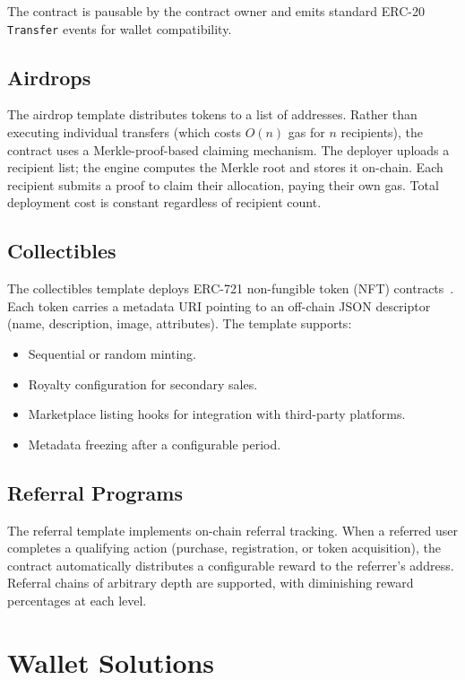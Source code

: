 \documentclass[11pt,letterpaper]{article}
\begin{document}
The contract is pausable by the contract owner and emits standard ERC-20
\texttt{Transfer} events for wallet compatibility.

\subsection{Airdrops}

The airdrop template distributes tokens to a list of addresses.  Rather than
executing individual transfers (which costs $O(n)$ gas for $n$ recipients),
the contract uses a Merkle-proof-based claiming mechanism.  The deployer
uploads a recipient list; the engine computes the Merkle root and stores it
on-chain.  Each recipient submits a proof to claim their allocation, paying
their own gas.  Total deployment cost is constant regardless of recipient
count.

\subsection{Collectibles}

The collectibles template deploys ERC-721 non-fungible token (NFT)
contracts~\cite{entriken2018}.  Each token carries a metadata URI pointing
to an off-chain JSON descriptor (name, description, image, attributes).  The
template supports:

\begin{itemize}[leftmargin=1.1em]
    \item Sequential or random minting.
    \item Royalty configuration for secondary sales.
    \item Marketplace listing hooks for integration with third-party platforms.
    \item Metadata freezing after a configurable period.
\end{itemize}

\subsection{Referral Programs}

The referral template implements on-chain referral tracking.  When a referred
user completes a qualifying action (purchase, registration, or token
acquisition), the contract automatically distributes a configurable reward to
the referrer's address.  Referral chains of arbitrary depth are supported, with
diminishing reward percentages at each level.

\section{Wallet Solutions}
\label{sec:wallets}
\end{document}
